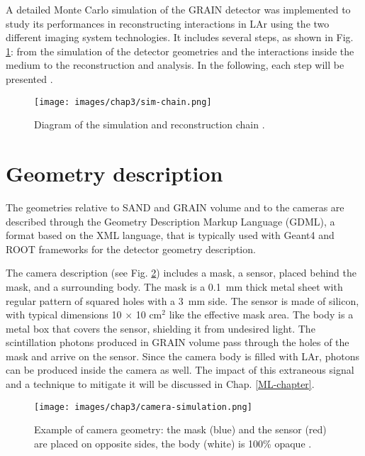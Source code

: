 \label{simulation-section}
A detailed Monte Carlo simulation of the GRAIN detector was implemented to study its performances in reconstructing interactions in LAr using the two different imaging system technologies. It includes several steps, as shown in Fig. \ref{fig:sim-chain}: from the simulation of the detector geometries and the interactions inside the medium to the reconstruction and analysis. In the following, each step will be presented \cite{tesi-cicero}. 

\begin{figure}[h!]
    \centering
    \texttt{[image: images/chap3/sim-chain.png]}
    \caption{Diagram of the simulation and reconstruction chain \cite{tesi-cicero}.}
    \label{fig:sim-chain}
\end{figure}

\section{Geometry description}
The geometries relative to SAND and GRAIN volume and to the cameras are described through the Geometry Description Markup Language (GDML), a format based on the XML language, that is typically used with Geant4 and ROOT frameworks for the detector geometry description. 

The camera description (see Fig. \ref{fig:camera-sim}) includes a mask, a sensor, placed behind the mask, and a surrounding body. The mask is a 0.1~mm thick metal sheet with regular pattern of squared holes with a 3~mm side. The sensor is made of silicon, with typical dimensions 10 $\times$ 10 $\text{cm}^2$ like the effective mask area. The body is a metal box that covers the sensor, shielding it from undesired light. The scintillation photons produced in GRAIN volume pass through the holes of the mask and arrive on the sensor. Since the camera body is filled with LAr, photons can be produced inside the camera as well. The impact of this extraneous signal and a technique to mitigate it will be discussed in Chap. \ref{ML-chapter}. %

\begin{figure}[h!]
    \centering
    \texttt{[image: images/chap3/camera-simulation.png]}
    \caption{Example of camera geometry: the mask (blue) and the sensor (red) are placed on opposite sides, the body (white) is 100\% opaque \cite{tesi-cicero}.}
    \label{fig:camera-sim}
\end{figure}

